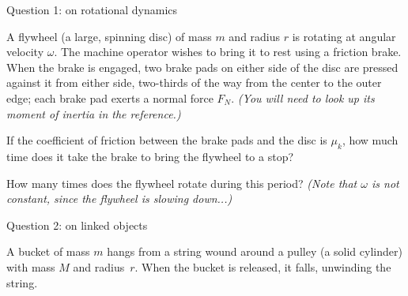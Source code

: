 \documentclass[12pt]{article}
\begin{document}
%
%
%
%
%
%
%

\Large
\centerline{}
\normalsize
\centerline{}


\centerline{\large Question 1: on rotational dynamics}
A flywheel (a large, spinning disc) of mass $m$ and radius $r$ is rotating
at angular velocity $\omega$. The machine operator wishes to bring it to rest using a friction brake. When the brake
is engaged, two brake pads on either side of the disc are pressed against it from either side, two-thirds
of the way from the center to the outer edge; each brake pad
exerts a normal force $F_N$. {\it(You will need to look up its moment of inertia in the reference.)}

If the coefficient of friction between the brake pads and the disc is $\mu_k$, how much time does it take the
brake to bring the flywheel to a stop?


\vspace{3.5in}

How many times does the flywheel rotate during this period? {\it (Note that $\omega$ is not constant, since the flywheel is slowing down...)}

\newpage
\centerline{\large Question 2: on linked objects}

A bucket of mass $m$ hangs from a string wound around a pulley
(a solid cylinder) with mass $M$ and radius~$r$. When the bucket is
released, it falls, unwinding the string.
\end{document}
